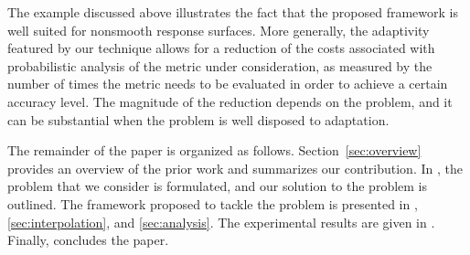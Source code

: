 The example discussed above illustrates the fact that the proposed framework is
well suited for nonsmooth response surfaces. More generally, the adaptivity
featured by our technique allows for a reduction of the costs associated with
probabilistic analysis of the metric under consideration, as measured by the
number of times the metric needs to be evaluated in order to achieve a certain
accuracy level. The magnitude of the reduction depends on the problem, and it
can be substantial when the problem is well disposed to adaptation.

The remainder of the paper is organized as follows. Section~\ref{sec:overview}
provides an overview of the prior work and summarizes our contribution. In
, the problem that we consider is formulated, and our solution
to the problem is outlined. The framework proposed to tackle the problem is
presented in , \ref{sec:interpolation}, and \ref{sec:analysis}.
The experimental results are given in . Finally,
 concludes the paper.
